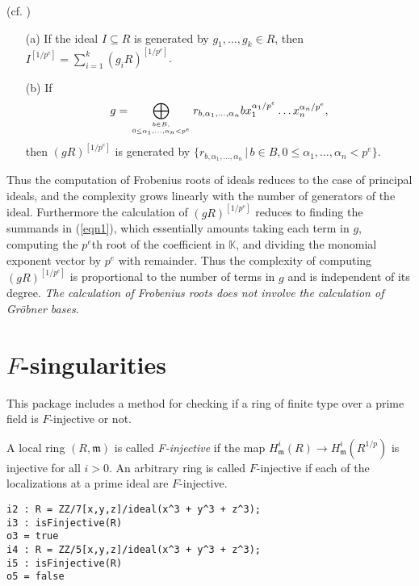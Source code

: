\documentclass[11pt]{amsart}
\begin{document}
\begin{proposition}(cf. \cite[\S 5]{KatzmanParameterTestIdealOfCMRings})
\begin{enumerate}
\item[(a)] If the ideal $I\subseteq R$ is generated by $g_1, \dots, g_k\in R$, then $I^{[1/p^e]}=\sum_{i=1}^k (g_i R)^{[1/p^e]}$.
\item[(b)] If
\begin{equation}\label{eqn1}
g=\bigoplus_{b\in B, \atop{0\leq \alpha_1, \dots, \alpha_n < p^e}} r_{b, \alpha_1, \dots, \alpha_n} b x_1^{\alpha_1/p^e} \dots x_n^{\alpha_n/p^e},
\end{equation}
then $(gR)^{[1/p^e]}$ is generated by $\{ r_{b, \alpha_1, \dots, \alpha_n} \,|\, b\in B, 0\leq \alpha_1, \dots, \alpha_n < p^e \}$.
\end{enumerate}
\end{proposition}

Thus the computation of Frobenius roots of ideals reduces to the case of principal ideals, and the complexity grows linearly with the number of generators of the ideal.
Furthermore the calculation of  $(gR)^{[1/p^e]}$ reduces to finding the summands in (\ref{eqn1}), which essentially amounts
taking each term in $g$, computing the $p^e$th root of the coefficient in $\mathbb{K}$, and dividing the monomial exponent vector by $p^e$ with remainder.
Thus the complexity of  computing $(gR)^{[1/p^e]}$ is proportional to the number of terms in $g$ and is independent of its degree.
\emph{The calculation of Frobenius roots does not involve the calculation of Gr\"obner bases.}



\section{$F$-singularities}

This package includes a method for checking if a ring of finite type over a prime field is $F$-injective or not.
\begin{definition}
A local ring $(R, \mathfrak{m})$ is called \emph{F-injective} if the map $H^{i}_{\mathfrak{m}}(R) \rightarrow H^{i}_{\mathfrak{m}}(R^{1/p})$ is injective for all $i >0$. An arbitrary ring is called $F$-injective if each of the localizations at a prime ideal are $F$-injective.
\end{definition}

\begin{verbatim}
i2 : R = ZZ/7[x,y,z]/ideal(x^3 + y^3 + z^3);
i3 : isFinjective(R)
o3 = true
i4 : R = ZZ/5[x,y,z]/ideal(x^3 + y^3 + z^3);
i5 : isFinjective(R)
o5 = false
\end{verbatim}
\end{document}
